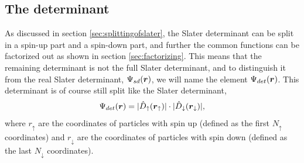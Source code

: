 \subsection{The determinant} \label{sec:slaterdeterminant}
As discussed in section \ref{sec:splittingofslater}, the Slater determinant can be split in a spin-up part and a spin-down part, and further the common functions can be factorized out as shown in section \ref{sec:factorizing}. This means that the remaining determinant is not the full Slater determinant, and to distinguish it from the real Slater determinant, $\Psi_{sd}(\boldsymbol{{r}})$, we will name the element $\Psi_{det}(\boldsymbol{{r}})$. This determinant is of course still split like the Slater determinant, 
\begin{equation}
\Psi_{det}(\boldsymbol{{r}})=
|\hat{D}_{\uparrow}(\boldsymbol{{r}}_{\uparrow})|\cdot |\hat{D}_{\downarrow}(\boldsymbol{{r}}_{\downarrow})|,
\end{equation}
where $r_{\uparrow}$ are the coordinates of particles with spin up (defined as the first $N_{\uparrow}$ coordinates) and $r_{\downarrow}$ are the coordinates of particles with spin down (defined as the last $N_{\downarrow}$ coordinates). 

